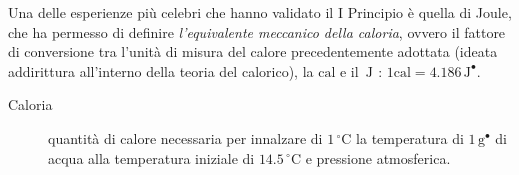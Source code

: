 \documentclass[10pt, oneside]{book}
\newcommand{\celsius}{\, \mathrm{{}^\circ C}}
\newcommand{\joule}[1]{\, \mathrm{J^{#1}}}
\newcommand{\grams}[1]{\, \mathrm{g^{#1}}}
\newcommand{\ds}{\displaystyle}
\begin{document}
Una delle esperienze più celebri che hanno validato il I Principio è quella di Joule, che ha permesso di definire \textit{l'equivalente meccanico della caloria}, ovvero il fattore di conversione tra l'unità di misura del calore precedentemente adottata (ideata addirittura all'interno della teoria del calorico), la $\mathrm{cal}$ e il $\joule{}$ : $\ds 1 \mathrm{cal} = 4.186 \joule{•}$.
\begin{description}
\item[Caloria] quantità di calore necessaria per innalzare di $1 \celsius$ la temperatura di $1 \grams{•}$ di acqua alla temperatura iniziale di $14.5 \celsius$ e pressione atmosferica.
\end{description}
\end{document}
